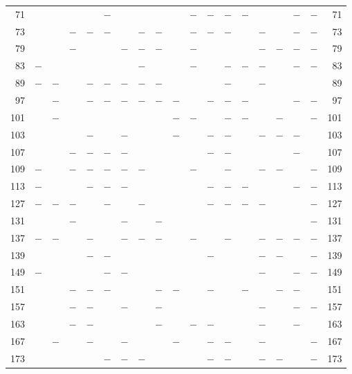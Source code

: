 \begin{center}
\begin{tabular}{r|c|c|c|c|c|c|c|c|c|c|c|c|c|c|c|c|c|r}
71 &  &  &  &  & $-$ &  &  &  &  & $-$ & $-$ & $-$ & $-$ &  &  & $-$ & $-$ & 71\\
73 &  &  & $-$ & $-$ & $-$ &  & $-$ & $-$ &  & $-$ & $-$ & $-$ &  & $-$ &  & $-$ & $-$ & 73\\
79 &  &  & $-$ &  &  & $-$ & $-$ & $-$ &  & $-$ &  &  &  & $-$ & $-$ & $-$ & $-$ & 79\\
83 & $-$ &  &  &  &  &  & $-$ &  &  & $-$ &  & $-$ & $-$ & $-$ &  & $-$ & $-$ & 83\\
89 & $-$ & $-$ &  & $-$ & $-$ & $-$ & $-$ & $-$ &  &  &  & $-$ &  & $-$ &  &  &  & 89\\
97 &  & $-$ &  & $-$ & $-$ & $-$ & $-$ & $-$ & $-$ &  & $-$ & $-$ & $-$ &  &  & $-$ & $-$ & 97\\
101 &  & $-$ &  &  &  &  &  &  & $-$ & $-$ &  & $-$ & $-$ &  & $-$ &  & $-$ & 101\\
103 &  &  &  & $-$ &  & $-$ &  &  & $-$ &  & $-$ & $-$ &  & $-$ & $-$ & $-$ &  & 103\\
107 &  &  & $-$ & $-$ & $-$ & $-$ &  &  &  &  & $-$ & $-$ &  &  &  & $-$ &  & 107\\
109 & $-$ &  & $-$ & $-$ & $-$ & $-$ & $-$ &  &  & $-$ &  & $-$ &  & $-$ & $-$ &  & $-$ & 109\\
113 & $-$ &  &  & $-$ & $-$ & $-$ &  &  &  &  & $-$ & $-$ & $-$ &  &  & $-$ & $-$ & 113\\
127 & $-$ & $-$ & $-$ &  & $-$ &  & $-$ &  &  &  & $-$ & $-$ & $-$ & $-$ &  &  & $-$ & 127\\
131 &  &  & $-$ &  &  & $-$ &  & $-$ &  &  &  &  &  &  &  &  & $-$ & 131\\
137 & $-$ & $-$ &  & $-$ &  & $-$ & $-$ & $-$ &  & $-$ &  & $-$ &  & $-$ & $-$ & $-$ & $-$ & 137\\
139 &  &  &  & $-$ & $-$ &  &  &  &  &  & $-$ &  &  & $-$ & $-$ &  & $-$ & 139\\
149 & $-$ &  &  &  & $-$ & $-$ &  &  &  &  &  &  &  & $-$ &  & $-$ & $-$ & 149\\
151 &  &  & $-$ & $-$ & $-$ &  &  & $-$ & $-$ &  & $-$ &  & $-$ &  & $-$ & $-$ &  & 151\\
157 &  &  & $-$ & $-$ &  & $-$ &  & $-$ &  &  &  &  &  & $-$ &  & $-$ & $-$ & 157\\
163 &  &  & $-$ & $-$ &  &  &  & $-$ &  & $-$ & $-$ &  &  & $-$ &  & $-$ &  & 163\\
167 &  & $-$ &  & $-$ &  & $-$ &  &  & $-$ &  & $-$ & $-$ &  & $-$ &  &  & $-$ & 167\\
173 &  &  &  &  & $-$ & $-$ & $-$ &  &  &  & $-$ & $-$ &  & $-$ & $-$ &  & $-$ & 173\\

\end{tabular}
\end{center}
